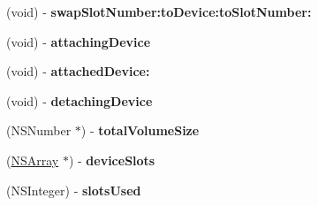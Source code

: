 \begin{DoxyCompactItemize}
\item 
\hypertarget{interface_d_a_c_a_l_device_node_a471cc2ec9fb594be2312a901f9a3efac}{
(void) -\/ {\bfseries swapSlotNumber:toDevice:toSlotNumber:}}
\label{interface_d_a_c_a_l_device_node_a471cc2ec9fb594be2312a901f9a3efac}

\item 
\hypertarget{interface_d_a_c_a_l_device_node_adb1fae71124ae86bfc26f848e48d5e3d}{
(void) -\/ {\bfseries attachingDevice}}
\label{interface_d_a_c_a_l_device_node_adb1fae71124ae86bfc26f848e48d5e3d}

\item 
\hypertarget{interface_d_a_c_a_l_device_node_ae24466dae518a3fa7178a06b284b8879}{
(void) -\/ {\bfseries attachedDevice:}}
\label{interface_d_a_c_a_l_device_node_ae24466dae518a3fa7178a06b284b8879}

\item 
\hypertarget{interface_d_a_c_a_l_device_node_aaecb41515b3cfe5169d52ed0c9ea2ac7}{
(void) -\/ {\bfseries detachingDevice}}
\label{interface_d_a_c_a_l_device_node_aaecb41515b3cfe5169d52ed0c9ea2ac7}

\item 
\hypertarget{interface_d_a_c_a_l_device_node_ad6cfb03d13ebb31dad559ac162008ce9}{
(NSNumber $\ast$) -\/ {\bfseries totalVolumeSize}}
\label{interface_d_a_c_a_l_device_node_ad6cfb03d13ebb31dad559ac162008ce9}

\item 
\hypertarget{interface_d_a_c_a_l_device_node_a2d33a0328cdbd727d7ea62489f6a4931}{
(\hyperlink{class_n_s_array}{NSArray} $\ast$) -\/ {\bfseries deviceSlots}}
\label{interface_d_a_c_a_l_device_node_a2d33a0328cdbd727d7ea62489f6a4931}

\item 
\hypertarget{interface_d_a_c_a_l_device_node_a8b38d06358ed2e9492351a6a25d650dd}{
(NSInteger) -\/ {\bfseries slotsUsed}}
\label{interface_d_a_c_a_l_device_node_a8b38d06358ed2e9492351a6a25d650dd}

\end{DoxyCompactItemize}
